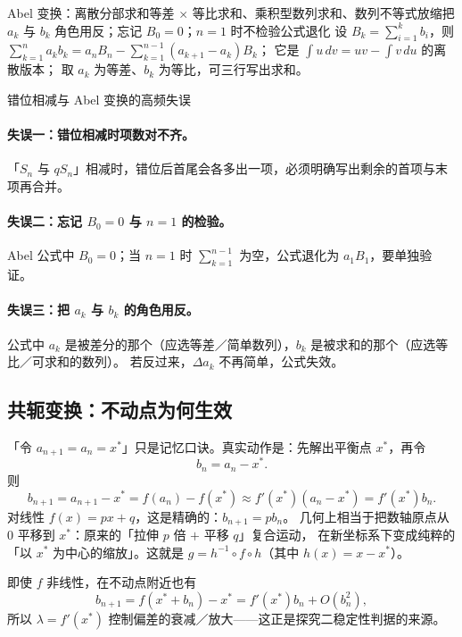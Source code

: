 \begin{explore}
\begin{conccard}[一级]{Abel 变换：离散分部求和}{等差 $\times$ 等比求和、乘积型数列求和、数列不等式放缩}{把 $a_k$ 与 $b_k$ 角色用反；忘记 $B_0=0$；$n=1$ 时不检验公式退化}
设 $B_k=\sum_{i=1}^kb_i$，则
$\sum_{k=1}^na_kb_k=a_nB_n-\sum_{k=1}^{n-1}(a_{k+1}-a_k)B_k$；
它是 $\int u\,dv=uv-\int v\,du$ 的离散版本；
取 $a_k$ 为等差、$b_k$ 为等比，可三行写出求和。
\end{conccard}

\begin{commonerror}{错位相减与 Abel 变换的高频失误}
\paragraph{失误一：错位相减时项数对不齐。}
「$S_n$ 与 $qS_n$」相减时，错位后首尾会各多出一项，必须明确写出剩余的首项与末项再合并。
\paragraph{失误二：忘记 $B_0=0$ 与 $n=1$ 的检验。}
Abel 公式中 $B_0=0$；当 $n=1$ 时 $\sum_{k=1}^{n-1}$ 为空，公式退化为 $a_1B_1$，要单独验证。
\paragraph{失误三：把 $a_k$ 与 $b_k$ 的角色用反。}
公式中 $a_k$ 是被差分的那个（应选等差／简单数列），$b_k$ 是被求和的那个（应选等比／可求和的数列）。
若反过来，$\Delta a_k$ 不再简单，公式失效。
\end{commonerror}

\subsection{共轭变换：不动点为何生效}


「令 $a_{n+1}=a_n=x^*$」只是记忆口诀。真实动作是：先解出平衡点 $x^*$，再令
\[
  b_n=a_n-x^* .
\]
则
\[
  b_{n+1}=a_{n+1}-x^*=f(a_n)-f(x^*)\approx f'(x^*)(a_n-x^*)=f'(x^*)b_n .
\]
对线性 $f(x)=px+q$，这是精确的：$b_{n+1}=pb_n$。
几何上相当于把数轴原点从 $0$ 平移到 $x^*$：原来的「拉伸 $p$ 倍 $+$ 平移 $q$」复合运动，
在新坐标系下变成纯粹的「以 $x^*$ 为中心的缩放」。这就是 $g=h^{-1}\circ f\circ h$（其中 $h(x)=x-x^*$）。

即使 $f$ 非线性，在不动点附近也有
\[
  b_{n+1}=f(x^*+b_n)-x^*=f'(x^*)b_n+O(b_n^2),
\]
所以 $\lambda=f'(x^*)$ 控制偏差的衰减／放大——这正是探究二稳定性判据的来源。


\end{explore}
